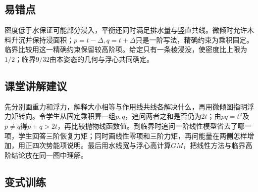 \documentclass[UTF8,fontset=fandol,a4paper,11pt]{ctexart}
\begin{document}
\subsection*{易错点}

密度低于水保证可能部分浸入，平衡还同时满足排水量与竖直共线。微倾时允许木料升沉并保持浸面积；$p=t-\Delta,q=t+\Delta$只是一阶写法，精确约束为乘积固定。临界比较用这一精确约束保留较高阶项。给定只有一条棱浸没，使密度比上限为$1/2$；临界$9/32$由本姿态的几何与浮心共同确定。



\subsection*{课堂讲解建议}

先分别画重力和浮力，解释大小相等与作用线共线各解决什么，再用微倾图指明浮力矩转向。令学生从固定乘积算一组$p,q$，追问两者之和是否仍为$2t$；由$pq=t^2$及$p\ne q$得$p+q>2t$，再比较抛物线函数值。到临界时追问一阶线性模型省去了哪一项，学生回答三阶恢复力矩；同时画线性零项和三阶力矩，再问能量在两侧怎样增加，用正四次势能项说明。最后用水线宽与浮心高计算$GM$，把线性方法与临界高阶结论放在同一图中理解。



\subsection*{变式训练}
\end{document}
